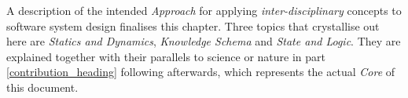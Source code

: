 A description of the intended \emph{Approach} for applying
\emph{inter-disciplinary} concepts to software system design finalises this
chapter. Three topics that crystallise out here are \emph{Statics and Dynamics},
\emph{Knowledge Schema} and \emph{State and Logic}. They are explained together
with their parallels to science or nature in part \ref{contribution_heading}
following afterwards, which represents the actual \emph{Core} of this document.




